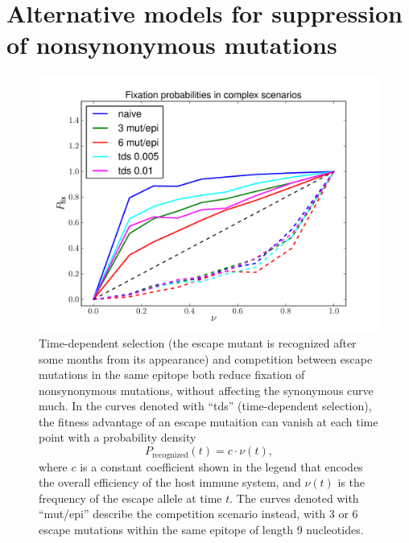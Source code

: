 \documentclass[rmp]{revtex4}
\begin{document}
\section{Alternative models for suppression of nonsynonymous mutations}
\begin{figure}[h]
\begin{center}
\includegraphics[width=0.5\linewidth]{simulations_graduallyepitopesandtimeselec}
\caption{Time-dependent selection (the escape mutant is recognized after some
months from its appearance) and competition between escape mutations in the same
epitope both reduce fixation of nonsynonymous mutations, without affecting the
synonymous curve much. In the
curves denoted with ``tds'' (time-dependent selection), the fitness advantage of
an escape mutaition can vanish at each time point with a probability density
\[ P_\text{recognized}(t) = c \cdot \nu(t), \]
where $c$ is a constant coefficient shown in the legend that encodes the overall
efficiency of the host immune system, and $\nu(t)$ is the frequency of the
escape allele at time $t$. The curves denoted with ``mut/epi'' describe the
competition scenario instead, with 3 or 6 escape mutations within the same
epitope of length 9 nucleotides.}
\label{fig:tds_wec}
\end{center}
\end{figure}


\end{document}
